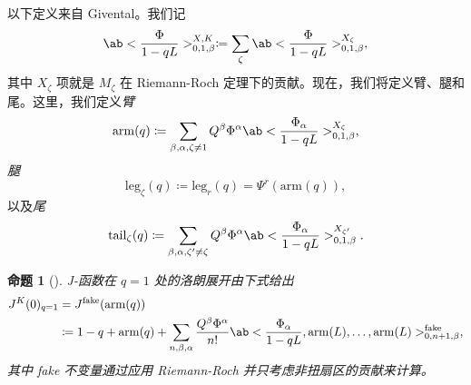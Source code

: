 \documentclass{amsart}
\newtheorem{prop}[thm]{命题}
\theoremstyle{definition}
\theoremstyle{remark}
\theoremstyle{plain}
\theoremstyle{definition}
\theoremstyle{remark}
\newcommand{\mr}[1]{\mathrm{#1}}
\newcommand{\1}{\mathbf{1}}
\newcommand{\2}{\mathbf{2}}
\newcommand{\3}{\mathbf{3}}
\begin{document}
%
%

以下定义来自 Givental。我们记
\[ \ab<\frac{\Phi}{1-qL}>_{0,1,\beta}^{X,K} \coloneqq \sum_{\zeta} \ab<\frac{\Phi}{1-qL}>_{0,1,\beta}^{X_{\zeta}}, \]
其中 \(X_{\zeta}\) 项就是 \(M_{\zeta}\) 在 Riemann-Roch 定理下的贡献。现在，我们将定义臂、腿和尾。这里，我们定义\textit{臂}
\[ \mr{arm}(q) \coloneqq \sum_{\beta, \alpha, \zeta \neq 1} Q^{\beta} \Phi^{\alpha}\ab<\frac{\Phi_{\alpha}}{1-qL}>_{0,1,\beta}^{X_{\zeta}}, \]
\textit{腿}
\[ \mr{leg}_{\zeta}(q) \coloneqq \mr{leg}_r(q) = \Psi^r (\mr{arm}(q)), \]
以及\textit{尾}
\[ \mr{tail}_{\zeta}(q) \coloneqq \sum_{\beta, \alpha, \zeta' \neq \zeta} Q^{\beta} \Phi^{\alpha} \ab<\frac{\Phi_{\alpha}}{1-qL}>_{0,1,\beta}^{X_{\zeta'}}. \]

\begin{prop}[{\cite{GiventalTonita2014}}]
    J-函数在 \(q = 1\) 处的洛朗展开由下式给出
    \begin{align*}
        J^K(0)_{q=1} &= J^{\mr{fake}}(\mr{arm}(q)) \\
        &\coloneqq 1-q + \mr{arm}(q) + \sum_{n,\beta,\alpha} \frac{Q^{\beta}\Phi^{\alpha}}{n!} \ab<\frac{\Phi_{\alpha}}{1-qL}, \mr{arm}(L), \ldots, \mr{arm}(L)>_{0,n+1,\beta}^{\mr{fake}},
    \end{align*}
    其中 fake 不变量通过应用 Riemann-Roch 并只考虑非扭扇区的贡献来计算。
\end{prop}
\end{document}
